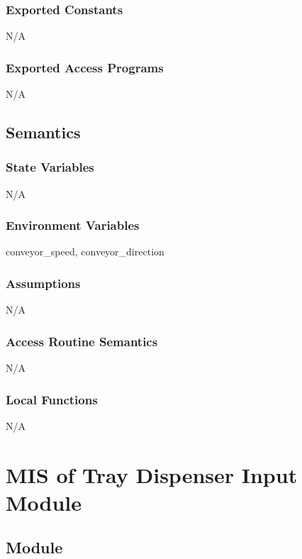 \documentclass[12pt, titlepage]{article}
\begin{document}
\subsubsection{Exported Constants}
N/A
\subsubsection{Exported Access Programs}

N/A

\subsection{Semantics}

\subsubsection{State Variables}

N/A

\subsubsection{Environment Variables}

conveyor\_speed, conveyor\_direction

\subsubsection{Assumptions}

N/A

\subsubsection{Access Routine Semantics}

N/A


\subsubsection{Local Functions}

N/A

\section{MIS of Tray Dispenser Input Module} \label{trayDispenserInput} 


\subsection{Module}
\end{document}
